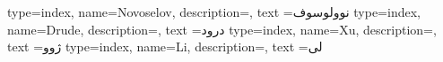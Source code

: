 {
    type=index,
    name={Novoselov},
    description={},
    text ={نوولوسوف}
}
{
    type=index,
    name={Drude},
    description={},
    text ={درود}
}
{
    type=index,
    name={Xu},
    description={},
    text ={ژوو}
}
{
    type=index,
    name={Li},
    description={},
    text ={لی}
}